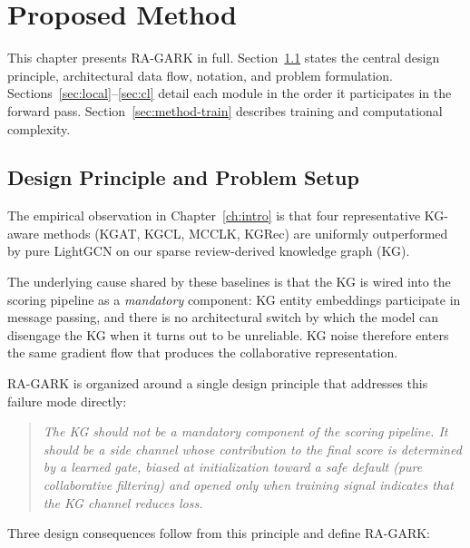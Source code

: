 \chapter{Proposed Method}
\label{ch:methodology}
\label{ch:architecture}

This chapter presents RA-GARK in full. Section~\ref{sec:approach-principle} states the central design principle, architectural data flow, notation, and problem formulation. Sections~\ref{sec:local}--\ref{sec:cl} detail each module in the order it participates in the forward pass. Section~\ref{sec:method-train} describes training and computational complexity.

\section{Design Principle and Problem Setup}
\label{sec:approach-principle}

The empirical observation in Chapter~\ref{ch:intro} is that four representative KG-aware methods (KGAT, KGCL, MCCLK, KGRec) are uniformly outperformed by pure LightGCN on our sparse review-derived knowledge graph (KG).

The underlying cause shared by these baselines is that the KG is wired into the scoring pipeline as a \emph{mandatory} component: KG entity embeddings participate in message passing, and there is no architectural switch by which the model can disengage the KG when it turns out to be unreliable. KG noise therefore enters the same gradient flow that produces the collaborative representation.

RA-GARK is organized around a single design principle that addresses this failure mode directly:

\begin{quote}
\emph{The KG should not be a mandatory component of the scoring pipeline. It should be a side channel whose contribution to the final score is determined by a learned gate, biased at initialization toward a safe default (pure collaborative filtering) and opened only when training signal indicates that the KG channel reduces loss.}
\end{quote}

Three design consequences follow from this principle and define RA-GARK:

